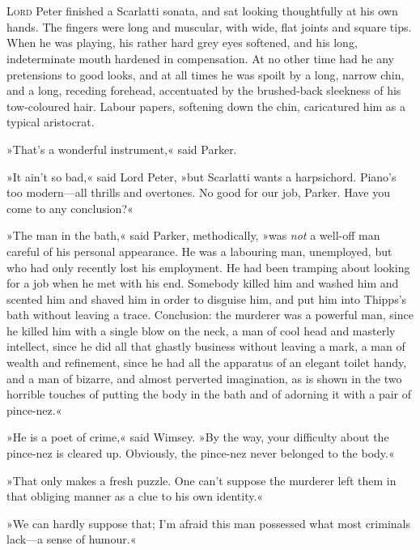 \chapter[Chapter \thechapter]{}
\lettrine[lines=4]{L}{ord} Peter finished a Scarlatti sonata, and sat looking thoughtfully at his own hands. The fingers were long and muscular, with wide, flat joints and square tips. When he was playing, his rather hard grey eyes softened, and his long, indeterminate mouth hardened in compensation. At no other time had he any pretensions to good looks, and at all times he was spoilt by a long, narrow chin, and a long, receding forehead, accentuated by the brushed-back sleekness of his tow-coloured hair. Labour papers, softening down the chin, caricatured him as a typical aristocrat.

»That's a wonderful instrument,« said Parker.

»It ain't so bad,« said Lord Peter, »but Scarlatti wants a harpsichord. Piano's too modern—all thrills and overtones. No good for our job, Parker. Have you come to any conclusion?«

»The man in the bath,« said Parker, methodically, »was \textit{not} a well-off man careful of his personal appearance. He was a labouring man, unemployed, but who had only recently lost his employment. He had been tramping about looking for a job when he met with his end. Somebody killed him and washed him and scented him and shaved him in order to disguise him, and put him into Thipps's bath without leaving a trace. Conclusion: the murderer was a powerful man, since he killed him with a single blow on the neck, a man of cool head and masterly intellect, since he did all that ghastly business without leaving a mark, a man of wealth and refinement, since he had all the apparatus of an elegant toilet handy, and a man of bizarre, and almost perverted imagination, as is shown in the two horrible touches of putting the body in the bath and of adorning it with a pair of pince-nez.«

»He is a poet of crime,« said Wimsey. »By the way, your difficulty about the pince-nez is cleared up. Obviously, the pince-nez never belonged to the body.«

»That only makes a fresh puzzle. One can't suppose the murderer left them in that obliging manner as a clue to his own identity.«

»We can hardly suppose that; I'm afraid this man possessed what most criminals lack—a sense of humour.«


